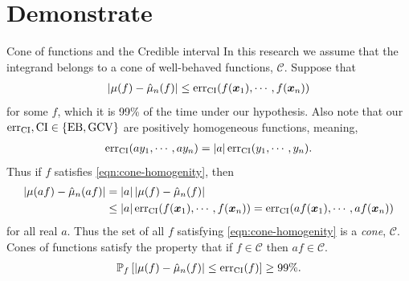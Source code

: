 \documentclass[handout, 10pt,compress,xcolor={usenames,dvipsnames}]{beamer} %
\newcommand{\MLE}{\textup{EB}}
\newcommand{\GCV}{\textup{GCV}}
\newcommand{\CI}{\textup{CI}}
\newcommand{\err}{{\text{err}}}
\def\abs#1{\ensuremath{\left \lvert #1 \right \rvert}}
\begin{document}
\section{Demonstrate}






\begin{frame}{Cone of functions and the Credible interval}
In this research we assume that the integrand belongs to a cone of well-behaved functions, ${\mathscr{C}}$.  
Suppose that 
\begin{align}
\label{eqn:cone-homogenity}
\abs{\mu(f) - \hmu_n(f)} \le \err_{\CI} (f(\vx_1), \cdots, f(\vx_n))
\end{align}
for some $f$, which it is 99\% of the time under our hypothesis. Also note that our $\err_{\CI}, \CI \in \{\MLE, \GCV\}$  %
are positively homogeneous functions, meaning, 
\begin{align*}
\err_{\CI} (a y_1, \cdots, a y_n) = \abs{a} \err_{\CI} ( y_1, \cdots,  y_n).
\end{align*}
Thus if $f$ satisfies \eqref{eqn:cone-homogenity}, then
\begin{align*}
\abs{\mu(af) - \hmu_n(af)} &= \abs{a} \abs{\mu(f) - \hmu_n(f)} \\
& \le \abs{a} \err_{\textup{CI}} (f(\vx_1), \cdots, f(\vx_n) ) 
 = \err_{\textup{CI}} (a f(\vx_1), \cdots, a f(\vx_n))
\end{align*}
for all real $a$. Thus the set of all $f$ satisfying \eqref{eqn:cone-homogenity} is a \emph{cone}, $\mathscr{C}$. Cones of functions satisfy the property that if $f \in \mathscr{C}$ then $af \in \mathscr{C}$.
\begin{align*}
 \mathbb{P}_f \left[
 |\mu(f)-\hmu_n(f)| \leq \err_{\CI}(f) \right] \ge 99\%.
\end{align*}
\end{frame}
\end{document}
